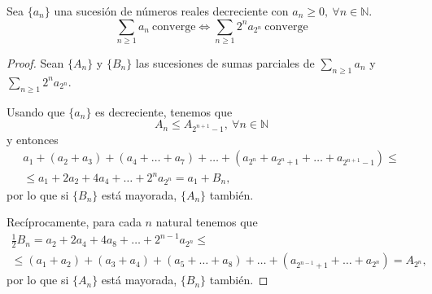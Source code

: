 \begin{prop}
    Sea $\{a_n\}$ una sucesión de números reales decreciente con $a_n \geq 0, ~ \forall n \in \mathbb{N}$.
    \begin{equation*}
        \displaystyle\sum_{n \geq 1} a_n ~ \text{converge} \Longleftrightarrow \displaystyle\sum_{n \geq 1} 2^n a_{2^n} ~ \text{converge}
    \end{equation*}
\end{prop}
\begin{proof}
    Sean $\{A_n\}$ y $\{B_n\}$ las sucesiones de sumas parciales de $\displaystyle\sum_{n \geq 1} a_n$ y $\displaystyle\sum_{n \geq 1} 2^n a_{2^n}$.
    
    Usando que $\{a_n\}$ es decreciente, tenemos que
    \begin{equation*}
        A_n \leq A_{2^{n+1}-1}, ~ \forall n \in \mathbb{N}
    \end{equation*}
    y entonces
    \begin{multline*}
       a_1+(a_2+a_3)+(a_4+\dots+a_7)+\dots+(a_{2^n}+a_{2^n+1}+\dots+a_{2^{n+1}-1})
       \leq \\ \leq
       a_1 + 2a_2+4a_4+\dots+2^n a_{2^n} = a_1+B_n,
    \end{multline*}
    por lo que si $\{B_n\}$ está mayorada, $\{A_n\}$ también.
    
    Recíprocamente, para cada $n$ natural tenemos que
    \begin{multline*}
        \frac{1}{2} B_n = a_2 +2a_4 +4a_8+\dots+2^{n-1}a_{2^n}
        \leq \\ \leq
        (a_1+a_2)+(a_3+a_4)+(a_5+\dots+a_8)+\dots+(a_{2^{n-1}+1}+\dots+a_{2^n})
        = A_{2^n},
    \end{multline*}
    por lo que si $\{A_n\}$ está mayorada, $\{B_n\}$ también.
\end{proof}

